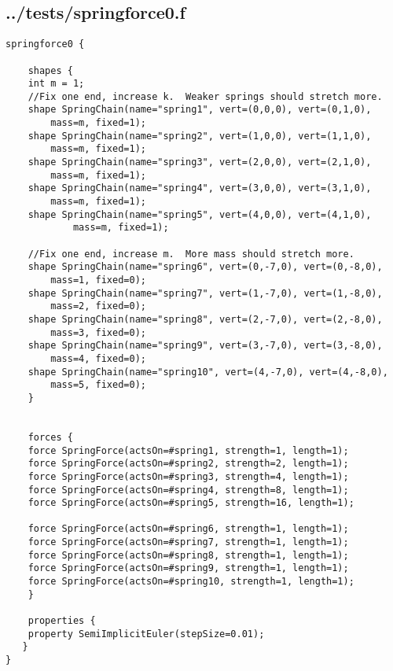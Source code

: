 \subsection*{../tests/springforce0.f}
\begin{lstlisting}
springforce0 {

    shapes {
	int m = 1;
	//Fix one end, increase k.  Weaker springs should stretch more.
	shape SpringChain(name="spring1", vert=(0,0,0), vert=(0,1,0),
		mass=m, fixed=1);
	shape SpringChain(name="spring2", vert=(1,0,0), vert=(1,1,0),
		mass=m, fixed=1);
	shape SpringChain(name="spring3", vert=(2,0,0), vert=(2,1,0),
		mass=m, fixed=1);
	shape SpringChain(name="spring4", vert=(3,0,0), vert=(3,1,0),
		mass=m, fixed=1);
	shape SpringChain(name="spring5", vert=(4,0,0), vert=(4,1,0),
			mass=m, fixed=1);

	//Fix one end, increase m.  More mass should stretch more.
	shape SpringChain(name="spring6", vert=(0,-7,0), vert=(0,-8,0),
		mass=1, fixed=0);
	shape SpringChain(name="spring7", vert=(1,-7,0), vert=(1,-8,0),
		mass=2, fixed=0);
	shape SpringChain(name="spring8", vert=(2,-7,0), vert=(2,-8,0),
		mass=3, fixed=0);
	shape SpringChain(name="spring9", vert=(3,-7,0), vert=(3,-8,0),
		mass=4, fixed=0);
	shape SpringChain(name="spring10", vert=(4,-7,0), vert=(4,-8,0),
		mass=5, fixed=0);
    }


    forces {
	force SpringForce(actsOn=#spring1, strength=1, length=1);
	force SpringForce(actsOn=#spring2, strength=2, length=1);
	force SpringForce(actsOn=#spring3, strength=4, length=1);
	force SpringForce(actsOn=#spring4, strength=8, length=1);
	force SpringForce(actsOn=#spring5, strength=16, length=1);

	force SpringForce(actsOn=#spring6, strength=1, length=1);
	force SpringForce(actsOn=#spring7, strength=1, length=1);
	force SpringForce(actsOn=#spring8, strength=1, length=1);
	force SpringForce(actsOn=#spring9, strength=1, length=1);
	force SpringForce(actsOn=#spring10, strength=1, length=1);
    }

    properties { 
	property SemiImplicitEuler(stepSize=0.01);
   }
}
\end{lstlisting}

